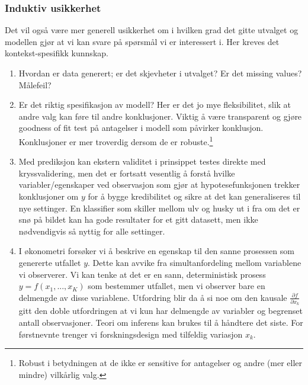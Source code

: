 \subsubsection{Induktiv usikkerhet}
Det vil også være mer generell usikkerhet om i hvilken grad det gitte utvalget og modellen gjør at vi kan svare på spørsmål vi er interessert i. Her kreves det kontekst-spesifikk kunnskap.
\begin{enumerate}
\item Hvordan er data generert; er det skjevheter i utvalget? Er det missing values? Målefeil?
\item Er det riktig spesifikasjon av modell? Her er det jo mye fleksibilitet, slik at andre valg kan føre til andre konklusjoner. Viktig å være transparent og gjøre goodness of fit test på antagelser i modell som påvirker konklusjon. Konklusjoner er mer troverdig dersom de er robuste.\footnote{Robust i betydningen at de ikke er sensitive for antagelser og andre (mer eller mindre) vilkårlig valg.}
\item Med prediksjon kan ekstern validitet i prinsippet testes direkte med kryssvalidering, men det er fortsatt vesentlig å forstå hvilke variabler/egenskaper ved observasjon som gjør at hypotesefunksjonen trekker konklusjoner om $y$ for å bygge kredibilitet og sikre at det kan generaliseres til nye settinger. En klassifier som skiller mellom ulv og husky ut i fra om det er snø på bildet kan ha gode resultater for et gitt datasett, men ikke nødvendigvis så nyttig for alle settinger. 
\item I økonometri forsøker vi å beskrive en egenskap til den sanne prosessen som genererte utfallet $y$. Dette kan avvike fra simultanfordeling mellom variablene vi observerer. Vi kan tenke at det er en sann, deterministisk prosess $y=f(x_1,...,x_K)$ som bestemmer utfallet, men vi observer bare en delmengde av disse variablene. Utfordring blir da å si noe om den kausale $\frac{\partial f}{\partial x_k}$ gitt den doble utfordringen at vi kun har delmengde av variabler og begrenset antall observasjoner. Teori om inferens kan brukes til å håndtere det siste. For førstnevnte trenger vi forskningsdesign med tilfeldig variasjon $x_k$.
\end{enumerate}
